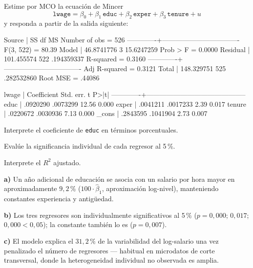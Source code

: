 \documentclass{academic-exam}
\begin{document}
\begin{ejercicio}
Estime por MCO la ecuación de Mincer
\[
  \texttt{lwage} = \beta_0 + \beta_1\,\texttt{educ}
  + \beta_2\,\texttt{exper} + \beta_3\,\texttt{tenure} + u
\]
y responda a partir de la salida siguiente:

\begin{salida}
      Source |       SS           df       MS      Number of obs   =       526
-------------+----------------------------------   F(3, 522)       =     80.39
       Model |  46.8741776         3  15.6247259   Prob > F        =    0.0000
    Residual |  101.455574       522  .194359337   R-squared       =    0.3160
-------------+----------------------------------   Adj R-squared   =    0.3121
       Total |  148.329751       525  .282532860   Root MSE        =    .44086

       lwage | Coefficient  Std. err.      t    P>|t|
-------------+--------------------------------------------
        educ |   .0920290   .0073299    12.56   0.000
       exper |   .0041211   .0017233     2.39   0.017
      tenure |   .0220672   .0030936     7.13   0.000
       _cons |   .2843595   .1041904     2.73   0.007
\end{salida}

\begin{apartados}
  \item Interprete el coeficiente de \texttt{educ} en términos
        porcentuales. 
  \item Evalúe la significancia individual de cada regresor al 5\,\%. 
  \item Interprete el $R^{2}$ ajustado. 
\end{apartados}
\begin{solucion}
\textbf{a)} Un año adicional de educación se asocia con un salario por
hora mayor en aproximadamente $9{,}2\,\%$
($100\cdot\hat\beta_1$, aproximación log-nivel), manteniendo constantes
experiencia y antigüedad.

\textbf{b)} Los tres regresores son individualmente significativos al
5\,\% ($p = 0{,}000$; $0{,}017$; $0{,}000 < 0{,}05$); la constante también
lo es ($p=0{,}007$).

\textbf{c)} El modelo explica el $31{,}2\,\%$ de la variabilidad del
log-salario una vez penalizado el número de regresores — habitual en
microdatos de corte transversal, donde la heterogeneidad individual no
observada es amplia.
\end{solucion}
\end{ejercicio}
\end{document}
